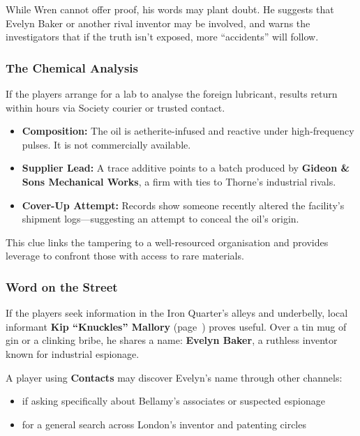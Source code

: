 While Wren cannot offer proof, his words may plant doubt. He suggests that Evelyn Baker or another rival inventor may be involved, and warns the investigators that if the truth isn’t exposed, more “accidents” will follow.

\subsubsection*{The Chemical Analysis}

If the players arrange for a lab to analyse the foreign lubricant, results return within hours via Society courier or trusted contact.

\begin{itemize}\raggedright
  \item \textbf{Composition:} The oil is aetherite-infused and reactive under high-frequency pulses. It is not commercially available.
  \item \textbf{Supplier Lead:} A trace additive points to a batch produced by \textbf{Gideon \& Sons Mechanical Works}, a firm with ties to Thorne’s industrial rivals.
  \item \textbf{Cover-Up Attempt:} Records show someone recently altered the facility’s shipment logs—suggesting an attempt to conceal the oil’s origin.
\end{itemize}

This clue links the tampering to a well-resourced organisation and provides leverage to confront those with access to rare materials.


\subsubsection{Word on the Street}
If the players seek information in the Iron Quarter’s alleys and underbelly, local informant \textbf{Kip “Knuckles” Mallory} (page~\pageref{npc:kip-mallory}) proves useful. Over a tin mug of gin or a clinking bribe, he shares a name: \textbf{Evelyn Baker}, a ruthless inventor known for industrial espionage.

A player using \textbf{Contacts} may discover Evelyn’s name through other channels:
\begin{itemize}
    \item {} if asking specifically about Bellamy’s associates or suspected espionage
    \item {} for a general search across London’s inventor and patenting circles
\end{itemize}


